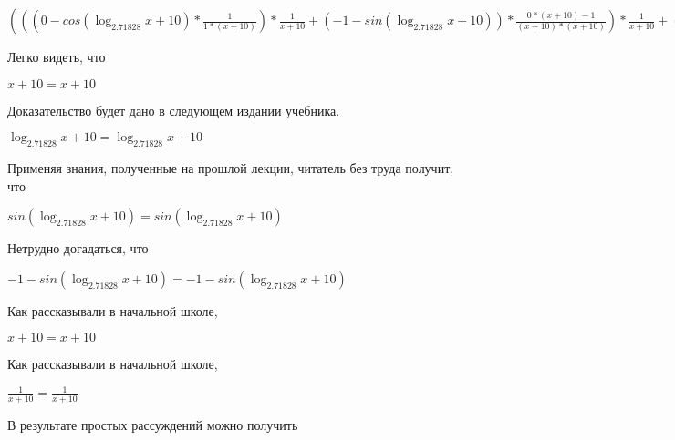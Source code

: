 \documentclass[12pt,a4paper,fleqn]{article}
\theoremstyle{definition}
\begin{document}
$((( 0  - cos(\log_{ 2.71828 }{ x  +  10 }) * \frac{ 1 }{ 1  * ( x  +  10 )}
) * \frac{ 1 }{ x  +  10 }
 + ( -1  - sin(\log_{ 2.71828 }{ x  +  10 })) * \frac{ 0  * ( x  +  10 ) -  1 }{( x  +  10 ) * ( x  +  10 )}
) * \frac{ 1 }{ x  +  10 }
 + ( -1  - sin(\log_{ 2.71828 }{ x  +  10 })) * \frac{ 1 }{ x  +  10 }
 * \frac{ 0  * ( x  +  10 ) -  1 }{( x  +  10 ) * ( x  +  10 )}
 + ( -1  - sin(\log_{ 2.71828 }{ x  +  10 })) * \frac{ 1 }{ 1  * ( x  +  10 )}
 * \frac{ -2 }{( x  +  10 ) * ( x  +  10 )}
 + cos(\log_{ 2.71828 }{ x  +  10 }) * \frac{ 0  * ( x  +  10 ) * ( x  +  10 ) -  -2  * ( 1  * ( x  +  10 ) + ( x  +  10 ) *  1 )}{( x  +  10 ) * ( x  +  10 ) * ( x  +  10 ) * ( x  +  10 )}
) * { 3 }^{sin(\log_{ 2.71828 }{ x  +  10 })} = ((( 0  - cos(\log_{ 2.71828 }{ x  +  10 }) * \frac{ 1 }{ 1  * ( x  +  10 )}
) * \frac{ 1 }{ x  +  10 }
 + ( -1  - sin(\log_{ 2.71828 }{ x  +  10 })) * \frac{ 0  * ( x  +  10 ) -  1 }{( x  +  10 ) * ( x  +  10 )}
) * \frac{ 1 }{ x  +  10 }
 + ( -1  - sin(\log_{ 2.71828 }{ x  +  10 })) * \frac{ 1 }{ x  +  10 }
 * \frac{ 0  * ( x  +  10 ) -  1 }{( x  +  10 ) * ( x  +  10 )}
 + ( -1  - sin(\log_{ 2.71828 }{ x  +  10 })) * \frac{ 1 }{ 1  * ( x  +  10 )}
 * \frac{ -2 }{( x  +  10 ) * ( x  +  10 )}
 + cos(\log_{ 2.71828 }{ x  +  10 }) * \frac{ 0  * ( x  +  10 ) * ( x  +  10 ) -  -2  * ( 1  * ( x  +  10 ) + ( x  +  10 ) *  1 )}{( x  +  10 ) * ( x  +  10 ) * ( x  +  10 ) * ( x  +  10 )}
) * { 3 }^{sin(\log_{ 2.71828 }{ x  +  10 })}$

Легко видеть, что 

$ x  +  10  =  x  +  10 $

Доказательство будет дано в следующем издании учебника. 

$\log_{ 2.71828 }{ x  +  10 } = \log_{ 2.71828 }{ x  +  10 }$

Применяя знания, полученные на прошлой лекции, читатель без труда получит, что 

$sin(\log_{ 2.71828 }{ x  +  10 }) = sin(\log_{ 2.71828 }{ x  +  10 })$

Нетрудно догадаться, что 

$ -1  - sin(\log_{ 2.71828 }{ x  +  10 }) =  -1  - sin(\log_{ 2.71828 }{ x  +  10 })$

Как рассказывали в начальной школе, 

$ x  +  10  =  x  +  10 $

Как рассказывали в начальной школе, 

$\frac{ 1 }{ x  +  10 }
 = \frac{ 1 }{ x  +  10 }
$

В результате простых рассуждений можно получить 
\end{document}
